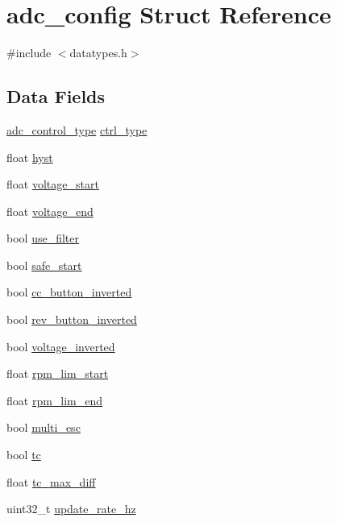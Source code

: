 \hypertarget{structadc__config}{}\section{adc\+\_\+config Struct Reference}
\label{structadc__config}


{\ttfamily \#include $<$datatypes.\+h$>$}

\subsection*{Data Fields}
\begin{DoxyCompactItemize}
\item 
\hyperlink{datatypes_8h_a185554b5aedce3cc1935ff0a2e3e60e3}{adc\+\_\+control\+\_\+type} \hyperlink{structadc__config_a2271ca0b113635b426295363d2a8966b}{ctrl\+\_\+type}
\item 
float \hyperlink{structadc__config_a67e26f0a581dc7931b59e06f3a9d29e7}{hyst}
\item 
float \hyperlink{structadc__config_abc0cfadc3208aed2809d929b7949ce75}{voltage\+\_\+start}
\item 
float \hyperlink{structadc__config_abca4948ec2e9155db78f582dd5d33b94}{voltage\+\_\+end}
\item 
bool \hyperlink{structadc__config_a77d720c38d2b1bb1b766ab943757e447}{use\+\_\+filter}
\item 
bool \hyperlink{structadc__config_ae0f5e962b4f4f130fa815b8a1d17a24e}{safe\+\_\+start}
\item 
bool \hyperlink{structadc__config_a3e9b1c323146cc42a82130c1ed1bea06}{cc\+\_\+button\+\_\+inverted}
\item 
bool \hyperlink{structadc__config_a0f81ffa0c15d572fd5f2db1a202cb3a6}{rev\+\_\+button\+\_\+inverted}
\item 
bool \hyperlink{structadc__config_a2053cd9e4ef0e3b51e6aa935fa42c45f}{voltage\+\_\+inverted}
\item 
float \hyperlink{structadc__config_a009df1769dd668beb51124d481f57917}{rpm\+\_\+lim\+\_\+start}
\item 
float \hyperlink{structadc__config_a52298130b8eeda979a0ebe2f8683cf7f}{rpm\+\_\+lim\+\_\+end}
\item 
bool \hyperlink{structadc__config_a0adcb4125f8defe13178bad39f30b5f9}{multi\+\_\+esc}
\item 
bool \hyperlink{structadc__config_adb12b652190d775d7d98e95fcde39856}{tc}
\item 
float \hyperlink{structadc__config_a08878e275186fe365e2e23cc038fed07}{tc\+\_\+max\+\_\+diff}
\item 
uint32\+\_\+t \hyperlink{structadc__config_af178fc28ad969574845764c755066cdc}{update\+\_\+rate\+\_\+hz}
\end{DoxyCompactItemize}


